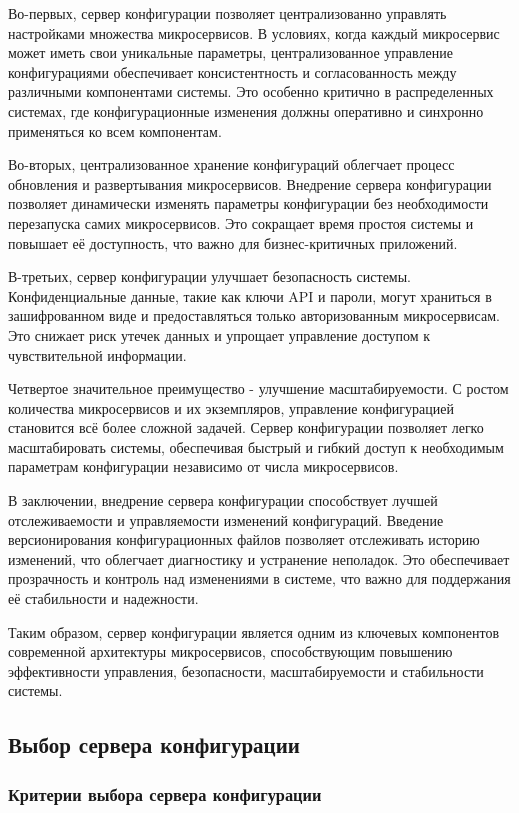 Во-первых, сервер конфигурации позволяет централизованно управлять настройками множества микросервисов.
В условиях,
когда каждый микросервис может иметь свои уникальные параметры, централизованное управление конфигурациями обеспечивает
консистентность и согласованность между различными компонентами системы.
Это особенно критично в распределенных
системах, где конфигурационные изменения должны оперативно и синхронно применяться ко всем компонентам.

Во-вторых, централизованное хранение конфигураций облегчает процесс обновления и развертывания микросервисов.
Внедрение
сервера конфигурации позволяет динамически изменять параметры конфигурации без необходимости перезапуска самих
микросервисов.
Это сокращает время простоя системы и повышает её доступность, что важно для бизнес-критичных приложений.

В-третьих, сервер конфигурации улучшает безопасность системы.
Конфиденциальные данные, такие как ключи API и пароли,
могут храниться в зашифрованном виде и предоставляться только авторизованным микросервисам.
Это снижает риск утечек
данных и упрощает управление доступом к чувствительной информации.

Четвертое значительное преимущество - улучшение масштабируемости.
С ростом количества микросервисов и их экземпляров,
управление конфигурацией становится всё более сложной задачей.
Сервер конфигурации позволяет легко масштабировать
системы, обеспечивая быстрый и гибкий доступ к необходимым параметрам конфигурации независимо от числа микросервисов.

В заключении, внедрение сервера конфигурации способствует лучшей отслеживаемости и управляемости изменений конфигураций.
Введение версионирования конфигурационных файлов позволяет отслеживать историю изменений, что облегчает диагностику и
устранение неполадок.
Это обеспечивает прозрачность и контроль над изменениями в системе, что важно для поддержания её
стабильности и надежности.

Таким образом, сервер конфигурации является одним из ключевых компонентов современной архитектуры микросервисов,
способствующим
повышению эффективности управления, безопасности, масштабируемости и стабильности системы.

\subsection{Выбор сервера конфигурации}

\subsubsection{Критерии выбора сервера конфигурации}

